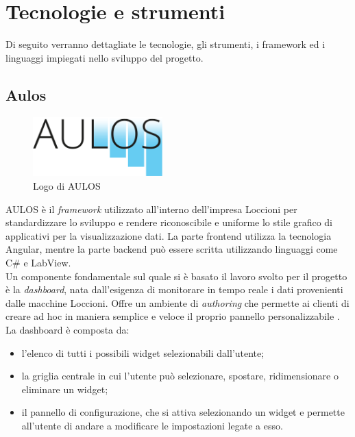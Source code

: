 \chapter{Tecnologie e strumenti}
\label{chap:tecnologie_strumenti}
Di seguito verranno dettagliate le tecnologie, gli strumenti, i framework ed i linguaggi impiegati nello sviluppo del progetto.
\section{Aulos}
\label{chap:aulos}
\begin{figure}[h]
\begin{center}
  \includegraphics[width=5cm]{images/aulos_logo.png}
  \caption{Logo di AULOS}
\end{center}
\end{figure}
AULOS è il \textit{framework} utilizzato all'interno dell'impresa Loccioni per standardizzare lo sviluppo e rendere riconoscibile e uniforme lo stile grafico di applicativi per la visualizzazione dati. La parte frontend utilizza la tecnologia Angular, mentre la parte backend può essere scritta utilizzando linguaggi come C\# e LabView.\\
Un componente fondamentale sul quale si è basato il lavoro svolto per il progetto è la \textit{dashboard}, nata dall'esigenza di monitorare in tempo reale i dati provenienti dalle macchine Loccioni. Offre un ambiente di \textit{authoring} che permette ai clienti di creare ad hoc in maniera semplice e veloce il proprio pannello personalizzabile \cite{AULOS}.
La dashboard è composta da:
\begin{itemize}
    \item l'elenco di tutti i possibili widget selezionabili dall'utente;
    \item la griglia centrale in cui l'utente può selezionare, spostare, ridimensionare o eliminare un widget;
    \item il pannello di configurazione, che si attiva selezionando un widget e permette all'utente di andare a modificare le impostazioni legate a esso.
\end{itemize}
